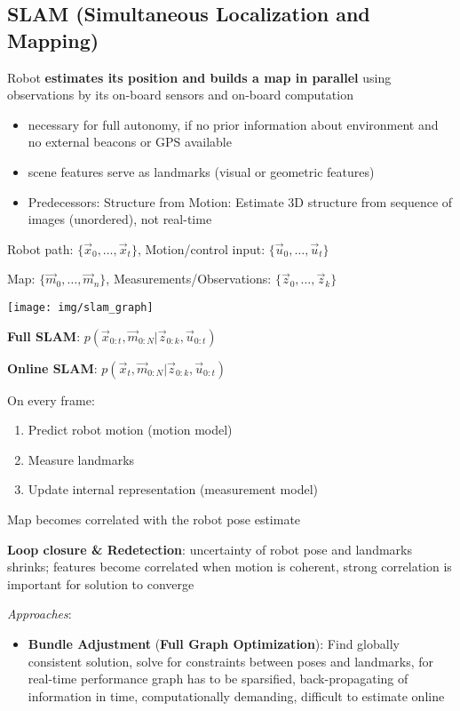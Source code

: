 \documentclass[fontsize=6pt]{scrartcl}
\begin{document}
\begin{multicols*}{4}
\subsection*{SLAM (Simultaneous Localization and Mapping)}

Robot \textbf{estimates its position and builds a map in parallel} using observations by its on-board sensors and on-board computation

\begin{itemize}
\item necessary for full autonomy, if no prior information about environment and no external beacons or GPS available
\item scene features serve as landmarks (visual or geometric features)
\item Predecessors: Structure from Motion: Estimate 3D structure from sequence of images (unordered), not real-time
\end{itemize}

Robot path: $\{\vec x_0, \ldots, \vec x_t\}$, Motion/control input: $\{\vec u_0, \ldots, \vec u_t\}$

Map: $\{\vec m_0, \ldots, \vec m_n\}$, Measurements/Observations: $\{\vec z_0, \ldots, \vec z_k\}$

{\centering
	\texttt{[image: img/slam\_graph]}
\par}

\textbf{Full SLAM}: $p(\vec x_{0:t}, \vec m_{0:N}| \vec z_{0:k}, \vec u_{0:t})$

\textbf{Online SLAM}: $p(\vec x_t, \vec m_{0:N}| \vec z_{0:k}, \vec u_{0:t})$

On every frame:
\begin{enumerate}
\item Predict robot motion (motion model)
\item Measure landmarks
\item Update internal representation (measurement model)
\end{enumerate}

Map becomes correlated with the robot pose estimate

\textbf{Loop closure \& Redetection}: uncertainty of robot pose and landmarks shrinks; features become correlated when motion is coherent, strong correlation is important for solution to converge

\textit{Approaches}: 
\begin{itemize}
	\item \textbf{Bundle Adjustment} (\textbf{Full Graph Optimization}): 
	Find globally consistent solution, solve for constraints between poses and landmarks, for real-time performance graph has to be sparsified, back-propagating of information in time, computationally demanding, difficult to estimate online
	

\end{itemize}
\end{multicols*}
\end{document}
